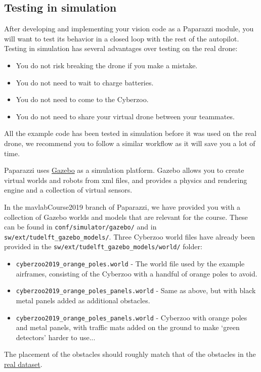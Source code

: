 \documentclass{article}
\begin{document}
\subsection{Testing in simulation}
After developing and implementing your vision code as a Paparazzi module, you will want to test its behavior in a closed loop with the rest of the autopilot.
Testing in simulation has several advantages over testing on the real drone:
\begin{itemize}
\item You do not risk breaking the drone if you make a mistake.
\item You do not need to wait to charge batteries.
\item You do not need to come to the Cyberzoo.
\item You do not need to share your virtual drone between your teammates.
\end{itemize}
All the example code has been tested in simulation before it was used on the real drone, we recommend you to follow a similar workflow as it will save you a lot of time.

Paparazzi uses \href{http://gazebosim.org/}{Gazebo} as a simulation platform. Gazebo allows you to create virtual worlds and robots from xml files, and provides a physics and rendering engine and a collection of virtual sensors.

In the mavlabCourse2019 branch of Paparazzi, we have provided you with a collection of Gazebo worlds and models that are relevant for the course. These can be found in \texttt{conf/simulator/gazebo/} and in \texttt{sw/ext/tudelft\_gazebo\_models/}. Three Cyberzoo world files have already been provided in the \texttt{sw/ext/tudelft\_gazebo\_models/world/} folder:
\begin{itemize}
\item \texttt{cyberzoo2019\_orange\_poles.world} - The world file used by the example airframes, consisting of the Cyberzoo with a handful of orange poles to avoid.
\item \texttt{cyberzoo2019\_orange\_poles\_panels.world} - Same as above, but with black metal panels added as additional obstacles.
\item \texttt{cyberzoo2019\_orange\_poles\_panels.world} - Cyberzoo with orange poles and metal panels, with traffic mats added on the ground to make `green detectors' harder to use...
\end{itemize}
The placement of the obstacles should roughly match that of the obstacles in the \href{https://surfdrive.surf.nl/files/index.php/s/68S6moWEIqCT14K}{real dataset}.
\end{document}
